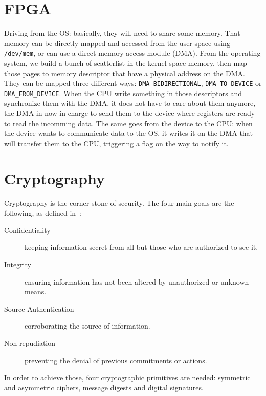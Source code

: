 \section{FPGA}

Driving from the OS: basically, they will need to share some memory.
That memory can be directly mapped and accessed from the user-space using \texttt{/dev/mem}, or can use a direct memory access module (DMA).
From the operating system, we build a bunch of scatterlist in the kernel-space memory, then map those pages to memory descriptor that have a physical address on the DMA.
They can be mapped three different ways: \texttt{DMA\_BIDIRECTIONAL}, \texttt{DMA\_TO\_DEVICE} or \texttt{DMA\_FROM\_DEVICE}.
When the CPU write something in those descriptors and synchronize them with the DMA, it does not have to care about them anymore, the DMA in now in charge to send them to the device where registers are ready to read the incomming data.
The same goes from the device to the CPU: when the device wants to communicate data to the OS, it writes it on the DMA that will transfer them to the CPU, triggering a flag on the way to notify it.




\section{Cryptography}

Cryptography is the corner stone of security.
The four main goals are the following, as defined in~\cite{Menezes1996}:
\begin{description}
	\item[Confidentiality] keeping information secret from all but those who are authorized to see it.
	\item[Integrity] ensuring information has not been altered by unauthorized or unknown means.
	\item[Source Authentication] corroborating the source of information.
	\item[Non-repudiation] preventing the denial of previous commitments or actions.
\end{description}

In order to achieve those, four cryptographic primitives are needed: symmetric and asymmetric ciphers, message digests and digital signatures.








